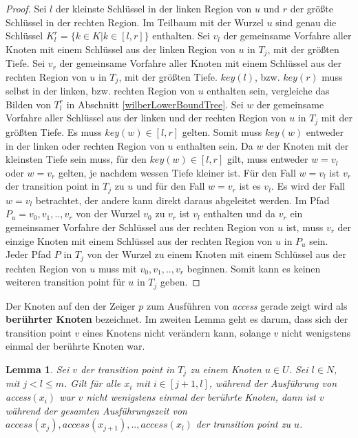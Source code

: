 \documentclass[a4paper,12pt]{article}
\newtheorem{Lemma}{Lemma}[section]
\begin{document}
\begin{proof}
	Sei $l$ der kleinste Schlüssel in der linken Region von $u$ und $r$ der größte Schlüssel in der rechten Region. Im Teilbaum mit der Wurzel $u$ sind genau die Schlüssel $K^r_l = \{k \in K \vert k \in \left[l,r\right]\}$ enthalten. Sei $v_l$ der gemeinsame Vorfahre aller Knoten mit einem Schlüssel aus der linken Region von $u$ in $T_j$, mit der größten Tiefe. Sei $v_r$ der gemeinsame Vorfahre aller Knoten mit einem Schlüssel aus der rechten Region von $u$ in $T_j$, mit der größten Tiefe. $\mathit{key\left(l\right)}$, bzw. $\mathit{key\left(r\right)}$ muss selbst in der linken, bzw. rechten Region von $u$ enthalten sein, vergleiche das Bilden von $T^r_l$ in Abschnitt \ref{wilberLowerBoundTree}. Sei $w$ der gemeinsame Vorfahre aller Schlüssel aus der linken und der rechten Region von $u$ in $T_j$ mit der größten Tiefe. Es muss $\mathit{key}\left(w\right) \in \left[l,r\right]$ gelten. Somit muss  $\mathit{key}\left(w\right)$ entweder in der linken oder rechten Region von $u$ enthalten sein. Da $w$ der Knoten mit der kleinsten Tiefe sein muss, für den  $\mathit{key\left(w\right)} \in \left[l,r\right]$  gilt, muss entweder $w = v_l$ oder $w = v_r$ gelten, je nachdem wessen Tiefe kleiner ist. Für den Fall $w = v_l$ ist $v_r$ der transition point in $T_j$ zu $u$ und für den Fall $w = v_r$ ist es $v_l$.
	Es wird der Fall $w = v_l$ betrachtet, der andere kann direkt daraus abgeleitet werden. Im Pfad $P_u = v_0,v_1,..,v_r$ von der Wurzel $v_0$ zu $v_r$ ist $v_l$ enthalten und da $v_r$ ein gemeinsamer Vorfahre der Schlüssel aus der rechten Region von $u$ ist, muss $v_r$ der einzige Knoten mit einem Schlüssel aus der rechten Region von $u$ in $P_u$ sein. Jeder Pfad $P$ in $T_j$ von der Wurzel zu einem Knoten mit einem Schlüssel aus der rechten Region von $u$ muss mit $v_0,v_1,..,v_r$ beginnen. Somit kann es keinen weiteren transition point für $u$ in $T_j$ geben. 
	
\end{proof}
\noindent Der Knoten auf den der Zeiger $p$ zum Ausführen von \textit{access} gerade zeigt wird als \textbf{berührter Knoten} bezeichnet.
Im zweiten Lemma geht es darum, dass sich der transition point $v$ eines Knotens nicht verändern kann, solange $v$ nicht wenigstens einmal der berührte Knoten war.



\begin{Lemma} \label{demaineLemma2} \label{lemmaDemaine2}
 Sei $v$ der transition point in $T_j$ zu einem Knoten $u \in U$.  Sei  \mbox{$l \in \mathit{N}$}, mit \mbox{$j < l \leq m$}. Gilt für alle $x_i$ mit $i \in \left[j + 1,l\right]$, während der Ausführung von \textit{access}$\left(x_i\right)$ war  $v$  nicht wenigstens einmal der berührte Knoten, dann ist $v$ während der gesamten Ausführungszeit von\\ $\textit{access}\left(x_j\right),\textit{access}\left(x_{j+1}\right),..,\textit{access}\left(x_l\right)$ der transition point zu $u$. 
\end{Lemma}
\end{document}
